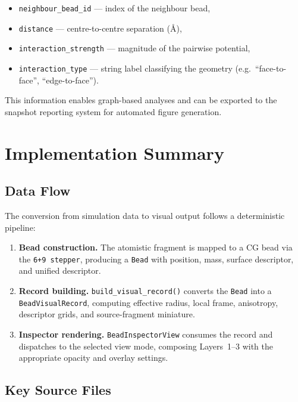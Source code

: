 \documentclass[12pt, a4paper, oneside]{article}
\newcommand{\type}[1]{\texttt{#1}}
\newcommand{\field}[1]{\texttt{#1}}
\newcommand{\Ang}{\text{\AA}}
\begin{document}
\begin{itemize}
  \item \field{neighbour\_bead\_id} --- index of the neighbour bead,
  \item \field{distance} --- centre-to-centre separation ($\Ang$),
  \item \field{interaction\_strength} --- magnitude of the pairwise
        potential,
  \item \field{interaction\_type} --- string label classifying the
        geometry (e.g.\ ``face-to-face'', ``edge-to-face'').
\end{itemize}

This information enables graph-based analyses and can be exported to
the snapshot reporting system for automated figure generation.

\section{Implementation Summary}

\subsection{Data Flow}

The conversion from simulation data to visual output follows a
deterministic pipeline:

\begin{enumerate}
  \item \textbf{Bead construction.}  The atomistic fragment is mapped
        to a CG bead via the \texttt{6+9 stepper}, producing a
        \type{Bead} with position, mass, surface descriptor, and
        unified descriptor.
  \item \textbf{Record building.}  \texttt{build\_visual\_record()}
        converts the \type{Bead} into a \type{BeadVisualRecord},
        computing effective radius, local frame, anisotropy,
        descriptor grids, and source-fragment miniature.
  \item \textbf{Inspector rendering.}  \type{BeadInspectorView}
        consumes the record and dispatches to the selected view mode,
        composing Layers~1--3 with the appropriate opacity and overlay
        settings.
\end{enumerate}

\subsection{Key Source Files}
\end{document}
